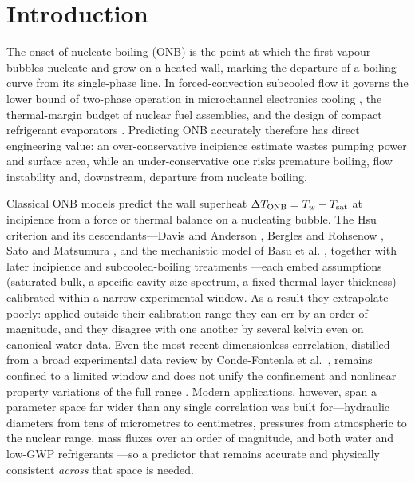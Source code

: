 \section{Introduction}
\label{sec:intro}

The onset of nucleate boiling (ONB) is the point at which the first vapour
bubbles nucleate and grow on a heated wall, marking the departure of a boiling
curve from its single-phase line. In forced-convection subcooled flow it
governs the lower bound of two-phase operation in microchannel electronics
cooling \cite{KANDLIKAR2004, LEEMUDAWAR2008}, the thermal-margin budget of
nuclear fuel assemblies, and the design of compact refrigerant evaporators
\cite{SAITOH2007}. Predicting ONB accurately therefore has
direct engineering value: an over-conservative incipience estimate wastes
pumping power and surface area, while an under-conservative one risks premature
boiling, flow instability and, downstream, departure from nucleate boiling.

Classical ONB models predict the wall superheat $\Delta T_{\mathrm{ONB}} = T_w - T_{\mathrm{sat}}$
at incipience from a force or thermal balance on a nucleating bubble. The Hsu
\cite{HSU1962} criterion and its descendants---Davis and Anderson
\cite{DAVIS1966}, Bergles and Rohsenow \cite{BERGLES1964}, Sato and Matsumura
\cite{SATOMATSUMURA1964}, and the mechanistic model of Basu et al. \cite{BASU2002}, together with later
incipience and subcooled-boiling treatments \cite{FROST1967, THOM1965}---each
embed assumptions (saturated bulk, a specific cavity-size spectrum, a fixed
thermal-layer thickness) calibrated within a narrow experimental window. As a
result they extrapolate poorly: applied outside their calibration range they
can err by an order of magnitude, and they disagree with one another by several
kelvin even on canonical water data. Even the most recent dimensionless
correlation, distilled from a broad experimental data review by Conde-Fontenla
et al.\ \cite{CONDEFONTENLA2024}, remains confined to a limited window and does
not unify the confinement and nonlinear property variations of the full range
\cite{HARIRCHIAN2009}. Modern applications, however, span a
parameter space far wider than any single correlation was built for---hydraulic
diameters from tens of micrometres to centimetres, pressures from atmospheric to
the nuclear range, mass fluxes over an order of magnitude, and both water and
low-GWP refrigerants \cite{LOWGWPREVIEW2023}---so a predictor that remains
accurate and physically consistent \emph{across} that space is needed.

